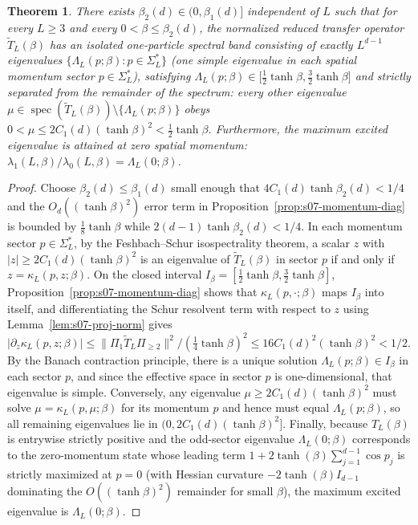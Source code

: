 \documentclass[11pt]{article}
\newtheorem{theorem}{Theorem}[section]
\theoremstyle{definition}
\begin{document}
\begin{theorem}
\label{thm:s07-isolated-branch}
There exists $\beta_2(d) \in (0, \beta_1(d)]$ independent of $L$ such that for every
$L \ge 3$ and every $0 < \beta \le \beta_2(d)$, the normalized reduced transfer
operator $\widetilde{T}_L(\beta)$ has an isolated one-particle spectral band
consisting of exactly $L^{d-1}$ eigenvalues $\{\Lambda_L(p; \beta) : p \in
\Sigma_L^*\}$ (one simple eigenvalue in each spatial momentum sector $p \in
\Sigma_L^*$), satisfying $\Lambda_L(p; \beta) \in \bigl[\frac{1}{2} \tanh \beta,
\frac{3}{2} \tanh \beta\bigr]$ and strictly separated from the remainder of the
spectrum: every other eigenvalue $\mu \in
\operatorname{spec}(\widetilde{T}_L(\beta)) \setminus \{\Lambda_L(p; \beta)\}$ obeys
$0 < \mu \le 2 C_1(d) (\tanh \beta)^2 < \frac{1}{2} \tanh \beta$. Furthermore, the
maximum excited eigenvalue is attained at zero spatial momentum: $\lambda_1(L,
\beta) / \lambda_0(L, \beta) = \Lambda_L(0; \beta)$.
\end{theorem}
\begin{proof}
Choose $\beta_2(d) \le \beta_1(d)$ small enough that $4 C_1(d) \tanh \beta_2(d) <
1/4$ and the $O_d((\tanh \beta)^2)$ error term in
Proposition~\ref{prop:s07-momentum-diag} is bounded by $\frac{1}{8} \tanh \beta$
while $2(d-1) \tanh \beta_2(d) < 1/4$. In each momentum sector $p \in \Sigma_L^*$,
by the Feshbach--Schur isospectrality theorem, a scalar $z$ with $|z| \ge 2 C_1(d)
(\tanh \beta)^2$ is an eigenvalue of $\widetilde{T}_L(\beta)$ in sector $p$ if and
only if $z = \kappa_L(p, z; \beta)$. On the closed interval $I_\beta = [\frac{1}{2}
\tanh \beta, \frac{3}{2} \tanh \beta]$, Proposition~\ref{prop:s07-momentum-diag}
shows that $\kappa_L(p, \cdot; \beta)$ maps $I_\beta$ into itself, and
differentiating the Schur resolvent term with respect to $z$ using
Lemma~\ref{lem:s07-proj-norm} gives $|\partial_z \kappa_L(p, z; \beta)| \le \|\Pi_1
\widetilde{T}_L \Pi_{\ge 2}\|^2 / (\frac{1}{4} \tanh \beta)^2 \le 16 C_1(d)^2 (\tanh
\beta)^2 < 1/2$. By the Banach contraction principle, there is a unique solution
$\Lambda_L(p; \beta) \in I_\beta$ in each sector $p$, and since the effective space
in sector $p$ is one-dimensional, that eigenvalue is simple. Conversely, any
eigenvalue $\mu \ge 2 C_1(d) (\tanh \beta)^2$ must solve $\mu = \kappa_L(p, \mu;
\beta)$ for its momentum $p$ and hence must equal $\Lambda_L(p; \beta)$, so all
remaining eigenvalues lie in $(0, 2 C_1(d) (\tanh \beta)^2]$. Finally, because
$T_L(\beta)$ is entrywise strictly positive and the odd-sector eigenvalue
$\Lambda_L(0; \beta)$ corresponds to the zero-momentum state whose leading term $1 +
2 \tanh(\beta) \sum_{j=1}^{d-1} \cos p_j$ is strictly maximized at $p = 0$ (with
Hessian curvature $-2 \tanh(\beta) I_{d-1}$ dominating the $O((\tanh\beta)^2)$
remainder for small $\beta$), the maximum excited eigenvalue is $\Lambda_L(0;
\beta)$.
\end{proof}
\end{document}
